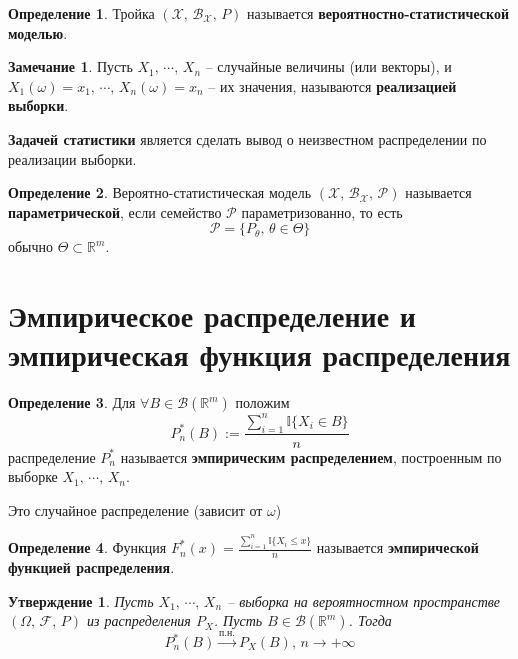 \documentclass[a4paper,12pt]{article}
\renewcommand{\leq}{\ensuremath{\leqslant}}
\theoremstyle{plain}
\newtheorem{proposition}{Утверждение}[section]
\theoremstyle{definition}
\newtheorem{definition}{Определение}[section]
\newtheorem*{note}{Замечание}
\theoremstyle{remark}
\begin{document}
\begin{definition}
  Тройка $(\mathcal{X},\, \mathcal{B}_\mathcal{X},\, P)$ называется \textbf{вероятностно-статистической моделью}.
\end{definition}

\begin{note}
  Пусть $X_1,\,\cdots,\,X_n$ -- случайные величины (или векторы), и $X_1(\omega) = x_1,\, \cdots,\, X_n(\omega) = x_n$ -- их значения, называются \textbf{реализацией выборки}.

  \textbf{Задачей статистики} является сделать вывод о неизвестном распределении по реализации выборки.
\end{note}

\begin{definition}
  Вероятно-статистическая модель $(\mathcal{X},\, \mathcal{B}_\mathcal{X},\, \mathcal{P})$ называется \textbf{параметрической}, если семейство $\mathcal{P}$ параметризованно, то есть
  \[
    \mathcal{P} = \{P_\theta,\, \theta \in \Theta\}
  \]
  обычно $\Theta \subset \mathbb{R}^m$.
\end{definition}

\section{Эмпирическое распределение и эмпирическая функция распределения}

\begin{definition}
  Для $\forall B \in \mathcal{B}(\mathbb{R}^m)$ положим 
  \[
    P_n^*(B) := \frac{\sum_{i = 1}^n \mathbb{I}\{X_i \in B\}}{n}
  \]
  распределение $P_n^*$ называется \textbf{эмпирическим распределением}, построенным по выборке $X_1,\,\cdots,\,X_n$.

  Это случайное распределение (зависит от $\omega$)
\end{definition}

\begin{definition}
  Функция $F_n^*(x) = \frac{\sum_{i = 1}^n \mathbb{I}\{X_i \leq x\}}{n}$ называется \textbf{эмпирической функцией распределения}.
\end{definition}

\begin{proposition}
  Пусть $X_1,\,\cdots,\,X_n$ -- выборка на вероятностном пространстве $(\Omega,\,\mathcal{F},\, P)$ из распределения $P_X$. Пусть $B \in \mathcal{B}(\mathbb{R}^m)$. Тогда
  \[
    P_n^*(B) \overset{\text{п.н.}}{\to} P_X(B),\, n \to +\infty
  \]
\end{proposition}
\end{document}
